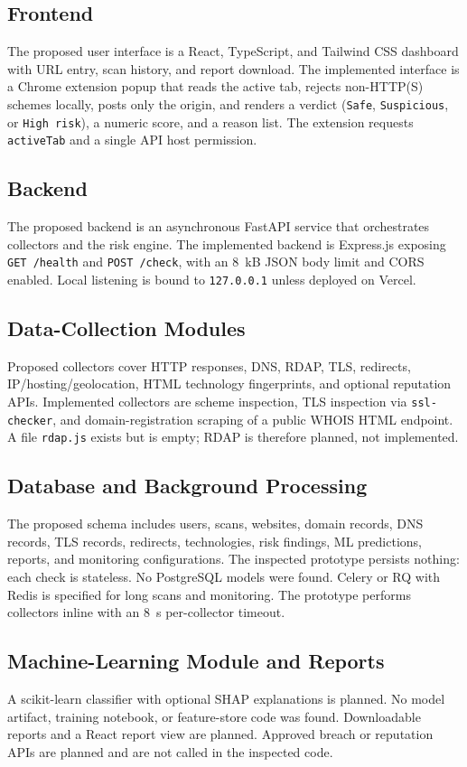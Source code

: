 \documentclass[conference]{IEEEtran}
\begin{document}
\subsection{Frontend}
The proposed user interface is a React, TypeScript, and Tailwind CSS dashboard with URL entry, scan history, and report download. The implemented interface is a Chrome extension popup that reads the active tab, rejects non-HTTP(S) schemes locally, posts only the origin, and renders a verdict (\texttt{Safe}, \texttt{Suspicious}, or \texttt{High risk}), a numeric score, and a reason list. The extension requests \texttt{activeTab} and a single API host permission.

\subsection{Backend}
The proposed backend is an asynchronous FastAPI service that orchestrates collectors and the risk engine. The implemented backend is Express.js exposing \texttt{GET /health} and \texttt{POST /check}, with an 8~kB JSON body limit and CORS enabled. Local listening is bound to \texttt{127.0.0.1} unless deployed on Vercel.

\subsection{Data-Collection Modules}
Proposed collectors cover HTTP responses, DNS, RDAP, TLS, redirects, IP/hosting/geolocation, HTML technology fingerprints, and optional reputation APIs. Implemented collectors are scheme inspection, TLS inspection via \texttt{ssl-checker}, and domain-registration scraping of a public WHOIS HTML endpoint. A file \texttt{rdap.js} exists but is empty; RDAP is therefore planned, not implemented.

\subsection{Database and Background Processing}
The proposed schema includes users, scans, websites, domain records, DNS records, TLS records, redirects, technologies, risk findings, ML predictions, reports, and monitoring configurations. The inspected prototype persists nothing: each check is stateless. No PostgreSQL models were found. Celery or RQ with Redis is specified for long scans and monitoring. The prototype performs collectors inline with an 8~s per-collector timeout.

\subsection{Machine-Learning Module and Reports}
A scikit-learn classifier with optional SHAP explanations is planned. No model artifact, training notebook, or feature-store code was found. Downloadable reports and a React report view are planned. Approved breach or reputation APIs are planned and are not called in the inspected code.
\end{document}
